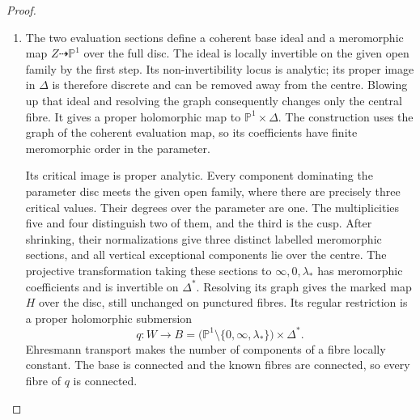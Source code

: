 \documentclass[11pt,a4paper]{article}
\numberwithin{equation}{section}
\theoremstyle{definition}
\begin{document}
\begin{proof}
\begin{enumerate}[label=\arabic*.]
Put $\mathcal J=\omega_{Z/\Delta}^{-4}$.
The sheaves $R^jp_*\mathcal J$ are coherent
\cite[\S6, Hauptsatz I, p.~59]{Grauert60}.
Multiplication by a nonzero parameter germ is injective on
$\mathcal J$ and on $p_*\mathcal J$, so $p_*\mathcal J$ is locally free
over the disc and free after shrinking.
The exact sequence for a fibre over $t$ gives
\[
 0\longrightarrow(p_*\mathcal J)_t/\mathfrak m_t(p_*\mathcal J)_t
 \longrightarrow H^0(Z_t,\mathcal J_t)
 \longrightarrow
 \ker\bigl((t'-t): (R^1p_*\mathcal J)_t
                       \longrightarrow(R^1p_*\mathcal J)_t\bigr)
 \longrightarrow0.
\]
The last term is supported in the torsion support of the
coherent sheaf $R^1p_*\mathcal J$, a closed discrete analytic
set.  At a point of the given open family outside this support,
the displayed comparison shows that $p_*\mathcal J$ has rank
two.  Shrinking makes the support empty away from the centre.
Thus a frame of $p_*\mathcal J$ gives the complete two-dimensional
linear system on each punctured fibre.  

\item The two evaluation sections define a coherent base ideal and
a meromorphic map $Z\dashrightarrow\mathbb P^1$ over the full
disc.  The ideal is locally invertible on the given open family
by the first step.  Its non-invertibility locus is analytic;
its proper image in $\Delta$ is therefore discrete and can be
removed away from the centre.  Blowing up that ideal and
resolving the graph consequently changes only the central
fibre.  It gives a proper holomorphic map to
$\mathbb P^1\times\Delta$.  The construction uses the graph
of the coherent evaluation map, so its coefficients have
finite meromorphic order in the parameter.

Its critical image is proper analytic.  Every component
dominating the parameter disc meets the given open family,
where there are precisely three critical values.  Their
degrees over the parameter are one.  The multiplicities five
and four distinguish two of them, and the third is the cusp.
After shrinking, their normalizations give three distinct
labelled meromorphic sections, and all vertical exceptional
components lie over the centre.  The projective transformation
taking these sections to $\infty,0,\lambda_*$ has meromorphic
coefficients and is invertible on $\Delta^*$.  Resolving its
graph gives the marked map $H$ over the disc, still
unchanged on punctured fibres.  Its regular restriction is a
proper holomorphic submersion
\[
 q:W\longrightarrow
 B=\bigl(\mathbb P^1\setminus\{0,\infty,\lambda_*\}\bigr)
          \times\Delta^*.
\]
Ehresmann transport makes the number of components of a fibre
locally constant.  The base is connected and the known fibres
are connected, so every fibre of $q$ is connected.


\end{enumerate}
\end{proof}
\end{document}
